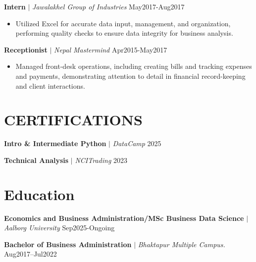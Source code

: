 \documentclass[10pt, letterpaper]{article}
\begin{document}
\noindent\textbf{Intern} $|$ \textit{Jawalakhel Group of Industries} \hfill May2017-Aug2017
\begin{itemize}[leftmargin=0.15in, topsep=0pt, partopsep=0pt, itemsep=-2pt]
    \item Utilized Excel for accurate data input, management, and organization, performing quality checks to ensure data integrity for business analysis.
\end{itemize}
\vspace{4pt}

\noindent\textbf{Receptionist} $|$ \textit{Nepal Mastermind} \hfill Apr2015-May2017
\begin{itemize}[leftmargin=0.15in, topsep=0pt, partopsep=0pt, itemsep=-2pt]
    \item Managed front-desk operations, including creating bills and tracking expenses and payments, demonstrating attention to detail in financial record-keeping and client interactions.
\end{itemize}
\vspace{4pt}

\section{CERTIFICATIONS}
\noindent\textbf{Intro \& Intermediate Python} $|$ \textit{DataCamp} \hfill 2025
\vspace{4pt}

\noindent\textbf{Technical Analysis} $|$ \textit{NCITrading} \hfill 2023
\vspace{4pt}



\section{Education}
\noindent\textbf{Economics and Business Administration/MSc Business Data Science} $|$ \textit{Aalborg University} \hfill Sep2025-Ongoing\\
\vspace{2pt}

\noindent\textbf{Bachelor of Business Administration} $|$ \textit{Bhaktapur Multiple Campus.} \hfill Aug2017–Jul2022\\
\vspace{2pt}
\end{document}
